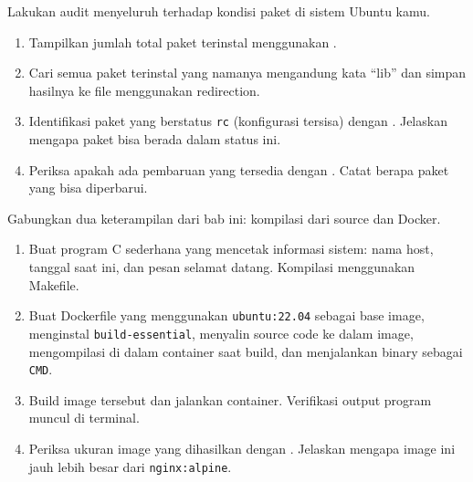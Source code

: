 \begin{exercisebox}
Lakukan audit menyeluruh terhadap kondisi paket di sistem Ubuntu kamu.
\begin{enumerate}
    \item Tampilkan jumlah total paket terinstal menggunakan .
    \item Cari semua paket terinstal yang namanya mengandung kata ``lib'' dan
        simpan hasilnya ke file  menggunakan redirection.
    \item Identifikasi paket yang berstatus \texttt{rc} (konfigurasi tersisa)
        dengan . Jelaskan mengapa paket bisa berada
        dalam status ini.
    \item Periksa apakah ada pembaruan yang tersedia dengan . Catat berapa paket yang bisa diperbarui.
\end{enumerate}
\end{exercisebox}

\begin{exercisebox}
Gabungkan dua keterampilan dari bab ini: kompilasi dari source dan Docker.
\begin{enumerate}
    \item Buat program C sederhana yang mencetak informasi sistem: nama host,
        tanggal saat ini, dan pesan selamat datang. Kompilasi menggunakan Makefile.
    \item Buat Dockerfile yang menggunakan \texttt{ubuntu:22.04} sebagai base
        image, menginstal \texttt{build-essential}, menyalin source code ke
        dalam image, mengompilasi di dalam container saat build, dan menjalankan
        binary sebagai \texttt{CMD}.
    \item Build image tersebut dan jalankan container. Verifikasi output program
        muncul di terminal.
    \item Periksa ukuran image yang dihasilkan dengan .
        Jelaskan mengapa image ini jauh lebih besar dari \texttt{nginx:alpine}.
\end{enumerate}
\end{exercisebox}

